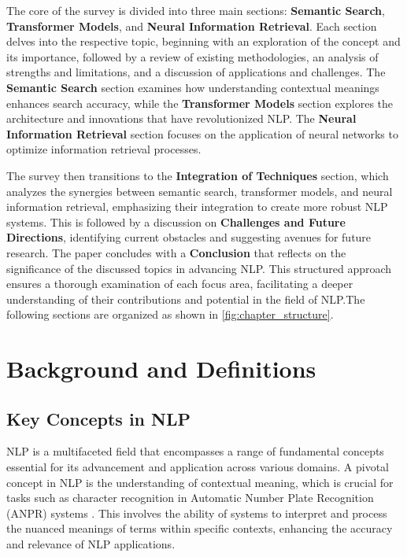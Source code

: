 The core of the survey is divided into three main sections: \textbf{Semantic Search}, \textbf{Transformer Models}, and \textbf{Neural Information Retrieval}. Each section delves into the respective topic, beginning with an exploration of the concept and its importance, followed by a review of existing methodologies, an analysis of strengths and limitations, and a discussion of applications and challenges. The \textbf{Semantic Search} section examines how understanding contextual meanings enhances search accuracy, while the \textbf{Transformer Models} section explores the architecture and innovations that have revolutionized NLP. The \textbf{Neural Information Retrieval} section focuses on the application of neural networks to optimize information retrieval processes.



The survey then transitions to the \textbf{Integration of Techniques} section, which analyzes the synergies between semantic search, transformer models, and neural information retrieval, emphasizing their integration to create more robust NLP systems. This is followed by a discussion on \textbf{Challenges and Future Directions}, identifying current obstacles and suggesting avenues for future research. The paper concludes with a \textbf{Conclusion} that reflects on the significance of the discussed topics in advancing NLP. This structured approach ensures a thorough examination of each focus area, facilitating a deeper understanding of their contributions and potential in the field of NLP.The following sections are organized as shown in \autoref{fig:chapter_structure}.








\section{Background and Definitions} \label{sec:Background and Definitions}



\subsection{Key Concepts in NLP} \label{subsec:Key Concepts in NLP}

NLP is a multifaceted field that encompasses a range of fundamental concepts essential for its advancement and application across various domains. A pivotal concept in NLP is the understanding of contextual meaning, which is crucial for tasks such as character recognition in Automatic Number Plate Recognition (ANPR) systems \cite{adak2022automaticnumberplaterecognition}. This involves the ability of systems to interpret and process the nuanced meanings of terms within specific contexts, enhancing the accuracy and relevance of NLP applications.



